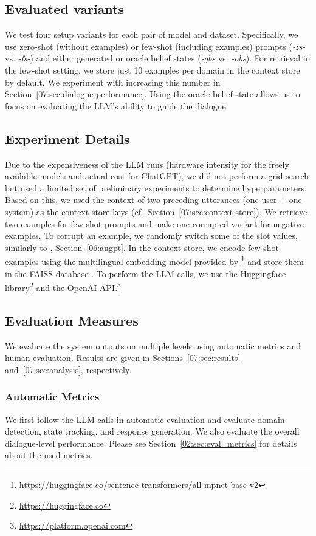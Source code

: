 \subsection{Evaluated variants}
We test four setup variants for each pair of model and dataset.
Specifically, we use zero-shot (without examples) or few-shot (including examples) prompts (\emph{-zs-} vs. \emph{-fs-}) and either generated or oracle belief states (\emph{-gbs} vs. \emph{-obs}).
For retrieval in the few-shot setting, we store just 10 examples per domain in the context store by default. We experiment with increasing this number in Section~\ref{07:sec:dialogue-performance}.
Using the oracle belief state allows us to focus on evaluating the LLM's ability to guide the dialogue.

\subsection{Experiment Details}
\label{subsec:exp-details}
Due to the expensiveness of the LLM runs (hardware intensity for the freely available models and actual cost for ChatGPT), we did not perform a grid search but used a limited set of preliminary experiments to determine hyperparameters.
Based on this, we used the context of two preceding utterances (one user + one system) as the context store keys (cf.~Section~\ref{07:sec:context-store}).
We retrieve two examples for few-shot prompts and make one corrupted variant for negative examples.
To corrupt an example, we randomly switch some of the slot values, similarly to \citet{kulhanek-etal-2021-augpt}, Section~\ref{06:augpt}.
In the context store, we encode few-shot examples using the multilingual embedding model provided by \citet{reimers-2020-multilingual-sentence-bert}\footnote{\url{https://huggingface.co/sentence-transformers/all-mpnet-base-v2}} and store them in the FAISS database \cite{johnson2019billion}.
To perform the LLM calls, we use the Huggingface library\footnote{\url{https://huggingface.co}} and the OpenAI API.\footnote{\url{https://platform.openai.com}}

\subsection{Evaluation Measures}

We evaluate the system outputs on multiple levels using automatic metrics and human evaluation. Results are given in Sections~\ref{07:sec:results} and~\ref{07:sec:analysis}, respectively.

\subsubsection*{Automatic Metrics}
We first follow the LLM calls in automatic evaluation and evaluate domain detection, state tracking, and response generation.
We also evaluate the overall dialogue-level performance.
Please see Section~\ref{02:sec:eval_metrics} for details about the used metrics.

